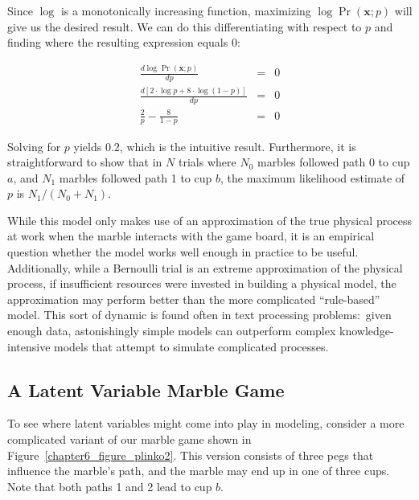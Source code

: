\noindent Since $\log$ is a monotonically increasing function,
maximizing $\log \Pr(\textbf{x};p)$ will give us the desired result.
We can do this differentiating with respect to $p$ and finding where
the resulting expression equals 0:

\begin{eqnarray*}
\frac{d \log \Pr(\textbf{x};p)}{dp} & = & 0\\
\frac{d [ 2\cdot \log p + 8 \cdot \log (1-p) ]}{dp} & = & 0 \\
\frac{2}{p} - \frac{8}{1-p} & = & 0
\end{eqnarray*}

\noindent Solving for $p$ yields $0.2$, which is the intuitive result.
Furthermore, it is straightforward to show that in $N$ trials where
$N_0$ marbles followed path 0 to cup $a$, and $N_1$ marbles followed
path 1 to cup $b$, the maximum likelihood estimate of $p$ is $N_1 /
(N_0 + N_1)$.

While this model only makes use of an approximation of the true
physical process at work when the marble interacts with the game
board, it is an empirical question whether the model works well enough
in practice to be useful.  Additionally, while a Bernoulli trial is an
extreme approximation of the physical process, if insufficient
resources were invested in building a physical model, the
approximation may perform better than the more complicated
``rule-based'' model.  This sort of dynamic is found often in text
processing problems:\ given enough data, astonishingly simple models
can outperform complex knowledge-intensive models that attempt to
simulate complicated processes.

\subsection{A Latent Variable Marble Game}
\label{chapter6_em_example}

To see where latent variables might come into play in modeling,
consider a more complicated variant of our marble game shown in
Figure~\ref{chapter6_figure_plinko2}.  This version consists of three
pegs that influence the marble's path, and the marble may end up in
one of three cups.  Note that both paths 1 and 2 lead to cup $b$.

